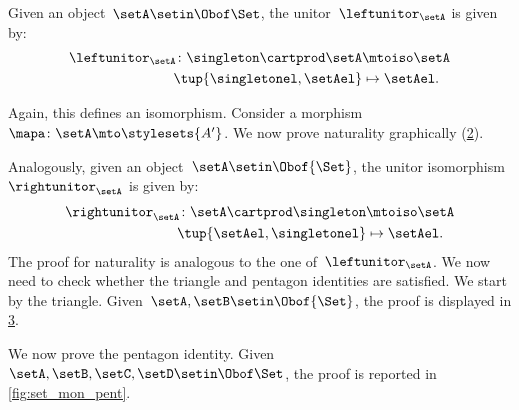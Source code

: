 \begin{example}
    \begin{figure}[h!]
        \centering
        \caption{}
        \label{fig:monoidal_set_ass_nat}
    \end{figure}

    Given an object~$\setA\setin \Obof\Set$, the unitor~$\leftunitor_\setA$ is given by:
    \begin{equation}
        \label{eq:set_mon_prod_4}
        \begin{aligned}
            \leftunitor_\setA\colon \singleton \cartprod \setA & \mtoiso \setA \\
            \tup{\singletonel,\setAel}                         & \mapsto \setAel.
        \end{aligned}
    \end{equation}

    Again, this defines an isomorphism.
    Consider a morphism~$\mapa\colon \setA\mto \stylesets{A'}$.
    We now prove naturality graphically (\cref{fig:monoidal_set_unit_nat}).

    \begin{figure}[h!]
        \centering
        \caption{}
        \label{fig:monoidal_set_unit_nat}
    \end{figure}

    Analogously, given an object~$\setA\setin \Obof{\Set}$, the unitor isomorphism~$\rightunitor_\setA$ is given by:
    \begin{equation}
        \label{eq:set_mon_prod_5}
        \begin{aligned}
            \rightunitor_\setA\colon \setA\cartprod \singleton & \mtoiso \setA \\
            \tup{\setAel,\singletonel}                         & \mapsto \setAel.
        \end{aligned}
    \end{equation}
    The proof for naturality is analogous to the one of~$\leftunitor_\setA$.
    We now need to check whether the triangle and pentagon identities are satisfied.
    We start by the triangle.
    Given~$\setA,\setB\setin \Obof{\Set}$, the proof is displayed in \cref{fig:set_mon_triangle}.

    \begin{figure}[h]
        \centering
        \caption{}
        \label{fig:set_mon_triangle}
    \end{figure}

    We now prove the pentagon identity.
    Given~$\setA,\setB,\setC,\setD\setin \Obof\Set$, the proof is reported in \cref{fig:set_mon_pent}.

    \begin{figure*}[h]
        \centering
        \caption{}
        \label{fig:set_mon_pent}
    \end{figure*}
\end{example}

